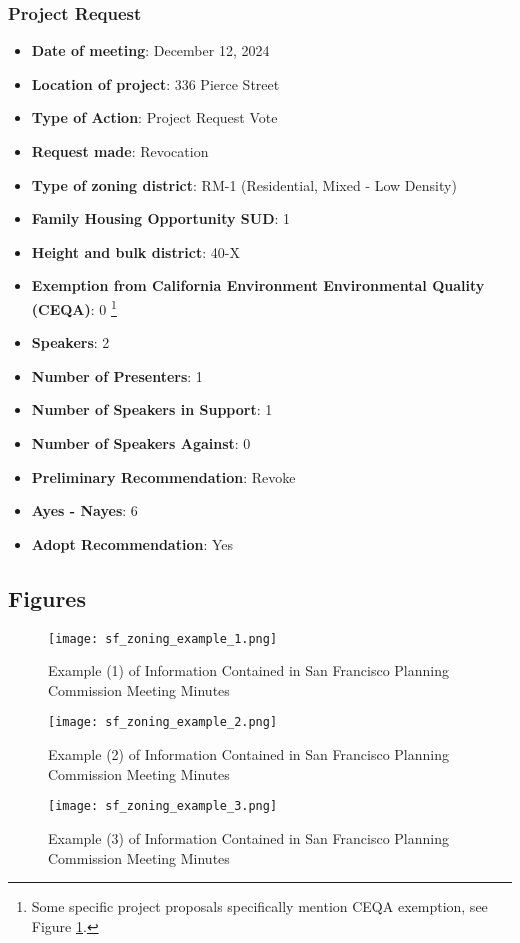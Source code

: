 \documentclass{article}[11pt]
\begin{document}
		\subsubsection{Project Request}
	\label{sec:operationalization_2}
	\begin{itemize}
	\itemsep0em 
		\item \textbf{Date of meeting}: December 12, 2024
		\item \textbf{Location of project}: 336 Pierce Street
		\item \textbf{Type of Action}: Project Request Vote
		\item \textbf{Request made}: Revocation
		\item \textbf{Type of zoning district}: RM-1 (Residential, Mixed - Low Density)
		\item \textbf{Family Housing Opportunity SUD}: 1
		\item \textbf{Height and bulk district}: 40-X
		\item \textbf{Exemption from California Environment Environmental Quality (CEQA)}: 0 \footnote{Some specific project proposals specifically mention CEQA exemption, see Figure \ref{sf_zoning_example_1}.}
		\item \textbf{Speakers}: 2
		\item \textbf{Number of Presenters}: 1
		\item \textbf{Number of Speakers in Support}: 1
		\item \textbf{Number of Speakers Against}: 0
		\item \textbf{Preliminary Recommendation}:  Revoke
		\item \textbf{Ayes - Nayes}: 6
		\item \textbf{Adopt Recommendation}: Yes
	\end{itemize}

	\subsection{Figures}
		\begin{figure}[ht]
		\centering
			\caption{Example (1) of Information Contained in San Francisco Planning Commission Meeting Minutes}
			\texttt{[image: sf\_zoning\_example\_1.png]}
			\label{sf_zoning_example_1}
		\end{figure}
		
		\begin{figure}[ht]
		\centering
			\caption{Example (2) of Information Contained in San Francisco Planning Commission Meeting Minutes}
			\texttt{[image: sf\_zoning\_example\_2.png]}
			\label{sf_zoning_example_2}
		\end{figure}
		
		\begin{figure}[ht]
		\centering
			\caption{Example (3) of Information Contained in San Francisco Planning Commission Meeting Minutes}
			\texttt{[image: sf\_zoning\_example\_3.png]}
			\label{sf_zoning_example_3}
		\end{figure}
	
\clearpage
\printbibliography
\end{document}
